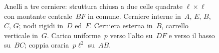 \begin{figure}[htbp]
	\caption{Anelli a tre cerniere: struttura chiusa a due celle
		quadrate $\ell\times\ell$ con montante centrale~$BF$ in
		comune. Cerniere interne in~$A$, $E$, $B$, $C$, $G$;
		nodi rigidi in~$D$ ed~$F$. Cerniera esterna in~$B$,
		carrello verticale in~$G$. Carico uniforme~$p$ verso
		l'alto su~$DF$ e verso il basso su~$BC$; coppia oraria~$p\ell^2$
		su~$AB$.}
	\label{fig:anello3c_schema}
\end{figure}
